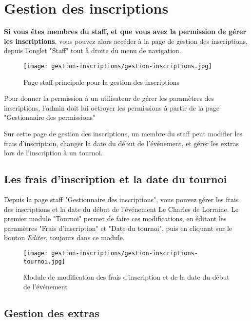 \section{Gestion des inscriptions}

\textbf{Si vous êtes membres du staff, et que vous avez la permission de gérer les inscriptions}, vous pouvez alors accéder à la page de gestion des inscriptions, depuis l'onglet "Staff" tout à droite du menu de navigation.

\begin{figure}[H]
\centering
\texttt{[image: gestion-inscriptions/gestion-inscriptions.jpg]}
\caption{Page staff principale pour la gestion des inscriptions}
\end{figure}

Pour donner la permission à un utilisateur de gérer les paramètres des inscriptions, l'admin doit lui octroyer les permissions à partir de la page "Gestionnaire des permissions"

\bigskip

Sur cette page de gestion des inscriptions, un membre du staff peut modifier les frais d'inscription, changer la date du début de l'événement, et gérer les extras lors de l'inscription à un tournoi.

\subsection{Les frais d'inscription et la date du tournoi}

Depuis la page staff "Gestionnaire des inscriptions", vous pouvez gérer les frais des inscriptions et la date du début de l'événement Le Charles de Lorraine. Le premier module "Tournoi" permet de faire ces modifications, en éditant les paramètres "Frais d'inscription" et "Date du tournoi", puis en cliquant sur le bouton \textit{Editer}, toujours dans ce module.

\begin{figure}[H]
\centering
\texttt{[image: gestion-inscriptions/gestion-inscriptions-tournoi.jpg]}
\caption{Module de modification des frais d'inscription et de la date du début de l'événement}
\end{figure}

\subsection{Gestion des extras}

